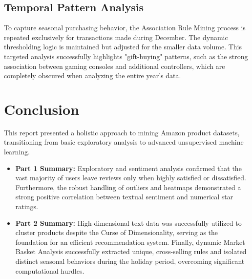 \documentclass[a4paper, 12pt]{article}
\begin{document}
\subsection{Temporal Pattern Analysis}
To capture seasonal purchasing behavior, the Association Rule Mining process is repeated exclusively for transactions made during December. The dynamic thresholding logic is maintained but adjusted for the smaller data volume. This targeted analysis successfully highlights "gift-buying" patterns, such as the strong association between gaming consoles and additional controllers, which are completely obscured when analyzing the entire year's data.

\section{Conclusion}
This report presented a holistic approach to mining Amazon product datasets, transitioning from basic exploratory analysis to advanced unsupervised machine learning.
\begin{itemize}
    \item \textbf{Part 1 Summary:} Exploratory and sentiment analysis confirmed that the vast majority of users leave reviews only when highly satisfied or dissatisfied. Furthermore, the robust handling of outliers and heatmaps demonstrated a strong positive correlation between textual sentiment and numerical star ratings.
    \item \textbf{Part 2 Summary:} High-dimensional text data was successfully utilized to cluster products despite the Curse of Dimensionality, serving as the foundation for an efficient recommendation system. Finally, dynamic Market Basket Analysis successfully extracted unique, cross-selling rules and isolated distinct seasonal behaviors during the holiday period, overcoming significant computational hurdles.
\end{itemize}
\end{document}
